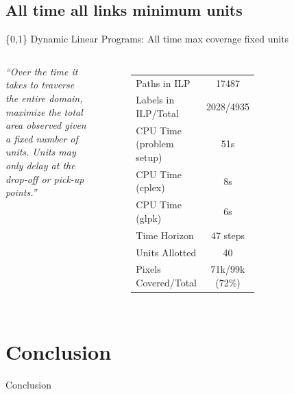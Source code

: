 \documentclass[xcolor=pdflatex,dvipsnames,table]{beamer}
\begin{document}
\subsection{All time all links minimum units}
\begin{frame}{\{0,1\} Dynamic Linear Programs: All time max coverage fixed units}
\begin{columns}

  \emph{``Over the time it takes to traverse the entire domain, maximize the total area observed given a fixed number of units. Units may only delay at the drop-off or pick-up points.''}
  \begin{figure}
    \begin{tabular}{|l|c|}
    \hline 
    Paths in ILP & 17487 \\
    Labels in ILP/Total & 2028/4935 \\
    CPU Time (problem setup) & 51s \\
    CPU Time (cplex) & 8s \\
    CPU Time (glpk) & 6s \\
    Time Horizon & 47 steps\\
    Units Allotted & 40\\
    Pixels Covered/Total & 71k/99k (72\%)\\
    \hline
    \end{tabular}
  \end{figure}


  \begin{figure}
    \centering
    \hfill
  \end{figure}
\end{columns}
\end{frame}


\section{Conclusion}
\begin{frame}{Conclusion}
 
\end{frame}
\end{document}
